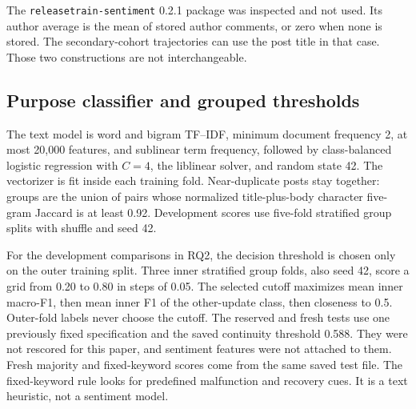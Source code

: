 \documentclass[conference,letterpaper]{IEEEtran}
\begin{document}
The \texttt{releasetrain-sentiment} 0.2.1 package was inspected and not used. Its author average is the mean of stored author comments, or zero when none is stored. The secondary-cohort trajectories can use the post title in that case. Those two constructions are not interchangeable.

\subsection{Purpose classifier and grouped thresholds}
The text model is word and bigram TF--IDF, minimum document frequency 2, at most 20,000 features, and sublinear term frequency, followed by class-balanced logistic regression with $C=4$, the liblinear solver, and random state 42. The vectorizer is fit inside each training fold. Near-duplicate posts stay together: groups are the union of pairs whose normalized title-plus-body character five-gram Jaccard is at least 0.92. Development scores use five-fold stratified group splits with shuffle and seed 42.

For the development comparisons in RQ2, the decision threshold is chosen only on the outer training split. Three inner stratified group folds, also seed 42, score a grid from 0.20 to 0.80 in steps of 0.05. The selected cutoff maximizes mean inner macro-F1, then mean inner F1 of the other-update class, then closeness to 0.5. Outer-fold labels never choose the cutoff. The reserved and fresh tests use one previously fixed specification and the saved continuity threshold 0.588. They were not rescored for this paper, and sentiment features were not attached to them. Fresh majority and fixed-keyword scores come from the same saved test file. The fixed-keyword rule looks for predefined malfunction and recovery cues. It is a text heuristic, not a sentiment model.
\end{document}
